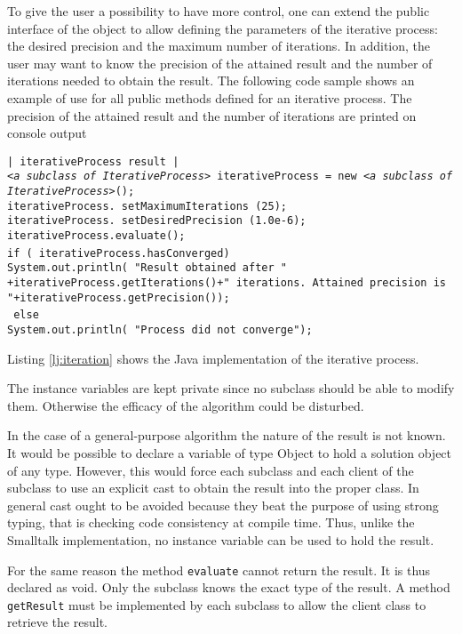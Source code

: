 \documentclass[twoside]{book}
\begin{document}
To give the user a possibility to have more control, one can
extend the public interface of the object to allow defining the
parameters of the iterative process: the desired precision and the
maximum number of iterations. In addition, the user may want to
know the precision of the attained result and the number of
iterations needed to obtain the result. The following code sample
shows an example of use for all public methods defined for an
iterative process. The precision of the attained result and the
number of iterations are printed on console output

\begin{codeExample}\break
{\tt | iterativeProcess result |\\ {\sl <a subclass of
IterativeProcess>} iterativeProcess = new {\sl <a subclass of
IterativeProcess>}();\\ iterativeProcess. setMaximumIterations
(25);\\ iterativeProcess. setDesiredPrecision (1.0e-6);\\
iterativeProcess.evaluate();\\ if ( iterativeProcess.hasConverged)
{\\
    System.out.println( "Result obtained after "\\+iterativeProcess.getIterations()+" iterations. Attained precision is "+iterativeProcess.getPrecision());
    \\} else {\\
    System.out.println( "Process did not converge");}\\
}
\end{codeExample}
Listing \ref{lj:iteration} shows the Java implementation of the
iterative process.

The instance variables are kept private since no subclass should
be able to modify them. Otherwise the efficacy of the algorithm
could be disturbed.

In the case of a general-purpose algorithm the nature of the
result is not known. It would be possible to declare a variable of
type Object to hold a solution object of any type. However, this
would force each subclass and each client of the subclass to use
an explicit cast to obtain the result into the proper class. In
general cast ought to be avoided because they beat the purpose of
using strong typing, that is checking code consistency at compile
time. Thus, unlike the Smalltalk implementation, no instance
variable can be used to hold the result.

For the same reason the method {\tt evaluate} cannot return the
result. It is thus declared as void. Only the subclass knows the
exact type of the result. A method {\tt getResult} must be
implemented by each subclass to allow the client class to retrieve
the result.
\end{document}

